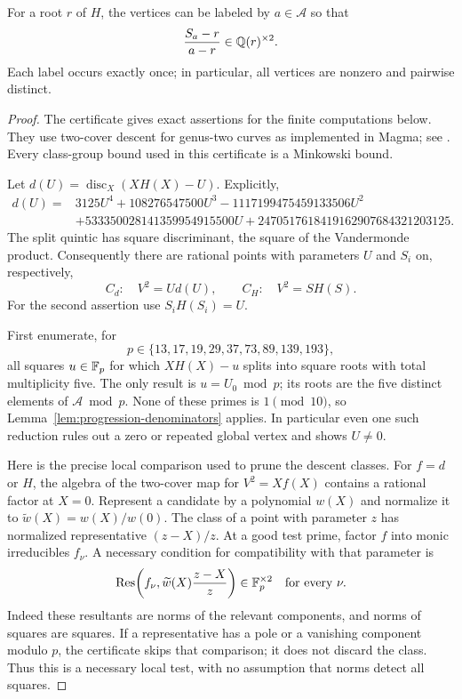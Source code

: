 \begin{proposition}\label{prop:five-classes}
For a root $r$ of $H$, the vertices can be labeled by
$a\in\mathcal A$ so that
\begin{equation}\label{eq:five-squareclasses}
 \frac{S_a-r}{a-r}\in\mathbb Q(r)^{\times2}.
\end{equation}
Each label occurs exactly once; in particular, all vertices are nonzero
and pairwise distinct.
\end{proposition}
\begin{proof}
The certificate 
gives exact assertions for the finite computations below. They use two-cover descent
for genus-two curves as implemented in Magma; see \cite{BruinStoll,magma}.
Every class-group bound used in this certificate is a Minkowski bound.

Let $d(U)=\operatorname{disc}_X(XH(X)-U)$. Explicitly,
\begin{align*}
 d(U)={}&3125U^4+108276547500U^3-1117199475459133506U^2\\
       &+533350028141359954915500U
         +2470517618419162907684321203125.
\end{align*}
The split quintic has square discriminant, the square of the
Vandermonde product. Consequently there are rational points with
parameters $U$ and $S_i$ on, respectively,
\[
 C_d:\quad V^2=Ud(U),\qquad C_H:\quad V^2=SH(S).
\]
For the second assertion use $S_iH(S_i)=U$.

First enumerate, for
\[
 p\in\{13,17,19,29,37,73,89,139,193\},
\]
all squares $u\in\mathbb F_p$ for which $XH(X)-u$ splits into square roots
with total multiplicity five. The only result is $u=U_0\bmod p$;
its roots are the five distinct elements of $\mathcal A\bmod p$.
None of these primes is $1\pmod{10}$, so Lemma~\ref{lem:progression-denominators}
applies. In particular even one such reduction rules out a zero or
repeated global vertex and shows $U\ne0$.

Here is the precise local comparison used to prune the descent classes.
For $f=d$ or $H$, the algebra of the two-cover map for $V^2=Xf(X)$
contains a rational factor at $X=0$. Represent a candidate by a polynomial
$w(X)$ and normalize it to $\widetilde w(X)=w(X)/w(0)$. The class of a
point with parameter $z$ has normalized representative $(z-X)/z$.
At a good test prime, factor $f$ into monic irreducibles $f_\nu$.
A necessary condition for compatibility with that parameter is
\begin{equation}\label{eq:resultant-filter}
 \operatorname{Res}\!\left(f_\nu,
       \widetilde w(X)\frac{z-X}{z}\right)\in\mathbb F_p^{\times2}
 \quad\text{for every }\nu.
\end{equation}
Indeed these resultants are norms of the relevant components, and
norms of squares are squares. If a representative has a pole or a
vanishing component modulo $p$, the certificate skips that comparison;
it does not discard the class. Thus this is a necessary local test,
with no assumption that norms detect all squares.


\end{proof}
